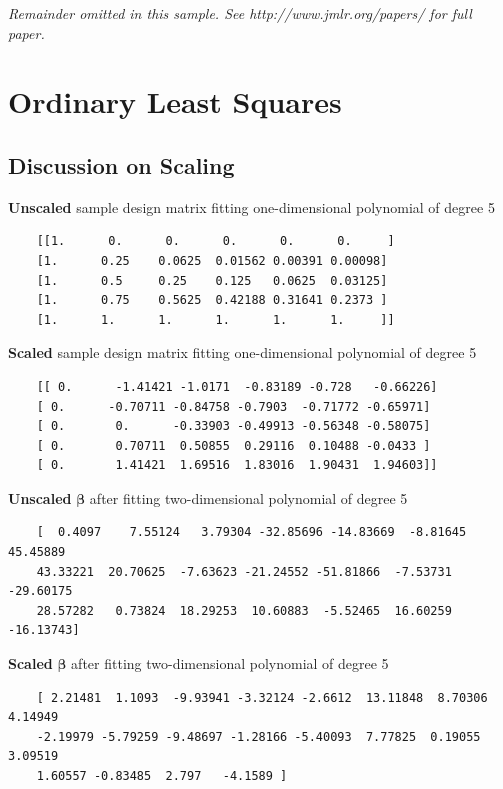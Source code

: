 \documentclass[twoside,11pt]{report}
\begin{document}
{\noindent \em Remainder omitted in this sample. See http://www.jmlr.org/papers/ for full paper.}






\section{Ordinary Least Squares}
\subsection{Discussion on Scaling}


\textbf{Unscaled} sample design matrix fitting one-dimensional polynomial of degree 5
\begin{verbatim}
    [[1.      0.      0.      0.      0.      0.     ]
    [1.      0.25    0.0625  0.01562 0.00391 0.00098]
    [1.      0.5     0.25    0.125   0.0625  0.03125]
    [1.      0.75    0.5625  0.42188 0.31641 0.2373 ]
    [1.      1.      1.      1.      1.      1.     ]]

\end{verbatim}
\textbf{Scaled} sample design matrix fitting one-dimensional polynomial of degree 5
\begin{verbatim}  
    [[ 0.      -1.41421 -1.0171  -0.83189 -0.728   -0.66226]
    [ 0.      -0.70711 -0.84758 -0.7903  -0.71772 -0.65971]
    [ 0.       0.      -0.33903 -0.49913 -0.56348 -0.58075]
    [ 0.       0.70711  0.50855  0.29116  0.10488 -0.0433 ]
    [ 0.       1.41421  1.69516  1.83016  1.90431  1.94603]]
\end{verbatim}
\textbf{Unscaled} $\boldsymbol{\beta}$ after fitting two-dimensional polynomial of degree 5
\begin{verbatim}
    [  0.4097    7.55124   3.79304 -32.85696 -14.83669  -8.81645  45.45889
    43.33221  20.70625  -7.63623 -21.24552 -51.81866  -7.53731 -29.60175
    28.57282   0.73824  18.29253  10.60883  -5.52465  16.60259 -16.13743]
\end{verbatim}
\textbf{Scaled} $\boldsymbol{\beta}$ after fitting two-dimensional polynomial of degree 5
\begin{verbatim}
    [ 2.21481  1.1093  -9.93941 -3.32124 -2.6612  13.11848  8.70306  4.14949
    -2.19979 -5.79259 -9.48697 -1.28166 -5.40093  7.77825  0.19055  3.09519
    1.60557 -0.83485  2.797   -4.1589 ]
\end{verbatim}
\end{document}
